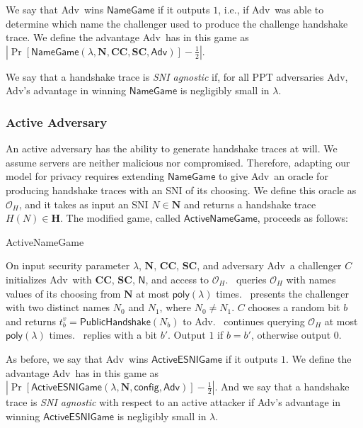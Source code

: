 \documentclass{article}
\newcommand{\adv}{{\sf Adv}}
\newcommand{\madv}{\mathsf{Adv}}
\theoremstyle{definition}
\begin{document}
We say that \adv\ wins $\mathsf{NameGame}$ if it outputs $1$, i.e., if \adv\ was able to determine which
name the challenger used to produce the challenge handshake trace. We define the advantage \adv\ has in this 
game as $|\Pr[\mathsf{NameGame}(\lambda, \mathbf{N}, \mathbf{CC}, \mathbf{SC}, \madv)] - \frac{1}{2}|$. 

We say that a handshake trace is \emph{SNI agnostic} if, for all PPT adversaries \adv, \adv's advantage in 
winning $\mathsf{NameGame}$ is negligibly small in $\lambda$. 

\subsubsection{Active Adversary}

An active adversary has the ability to generate handshake traces at will. We assume servers are neither malicious nor compromised. 
Therefore, adapting our model for privacy requires extending $\mathsf{NameGame}$ to give \adv\ an oracle for producing handshake
traces with an SNI of its choosing. We define this oracle as $\mathcal{O}_H$, and it takes as input an SNI $N \in \mathbf{N}$
and returns a handshake trace $H(N) \in \mathbf{H}$. The modified game, called $\mathsf{ActiveNameGame}$, proceeds as follows:

\begin{algorithm}
\caption{{\sf ActiveNameGame}} 
\label{alg:active-esnigame}
\begin{algorithmic}[1]
  \STATE On input security parameter $\lambda$, $\mathbf{N}$, $\mathbf{CC}$, $\mathbf{SC}$, 
  and adversary \adv\, a challenger $C$ initializes \adv\ with $\mathbf{CC}$, $\mathbf{SC}$, 
  $\mathsf{N}$, and access to $\mathcal{O}_H$.
  \STATE \adv\ queries $\mathcal{O}_H$ with names values of its choosing from $\mathbf{N}$ at most $\mathsf{poly}(\lambda)$ times.
  \STATE \adv\ presents the challenger with two distinct names $N_0$ and $N_1$, where $N_0 \not= N_1$.
  \STATE $C$ chooses a random bit $b$ and returns $t_b^v = \mathsf{PublicHandshake}(N_b)$ to \adv.
  \STATE \adv\ continues querying $\mathcal{O}_H$ at most $\mathsf{poly}(\lambda)$ times.
  \STATE \adv\ replies with a bit $b'$.
  \STATE Output $1$ if $b = b'$, otherwise output $0$.
\end{algorithmic}
\end{algorithm}

As before, we say that \adv\ wins $\mathsf{ActiveESNIGame}$ if it outputs $1$. 
We define the advantage \adv\ has in this game as
$|\Pr[\mathsf{ActiveESNIGame}(\lambda, \mathbf{N}, \mathsf{config}, \madv)] - \frac{1}{2}|$. 
And we say that a handshake trace is \emph{SNI agnostic} with respect to an active attacker 
if \adv's advantage in winning $\mathsf{ActiveESNIGame}$ is negligibly small in $\lambda$.
\end{document}
